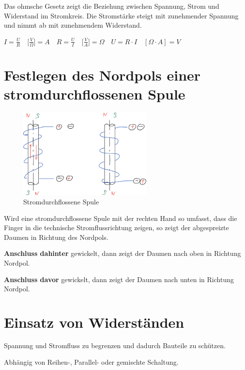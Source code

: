 Das ohmsche Gesetz zeigt die Beziehung zwischen Spannung, Strom und
Widerstand im Stromkreis. Die Stromstärke steigt mit zunehmender
Spannung und nimmt ab mit zunehmendem Widerstand.

$\boxed{I = \frac{U}{R}} \quad \bigl[\frac{V}{\Omega}\bigl] = A \quad  \boxed{R = \frac{U}{I}} \quad \bigl[\frac{V}{A}\bigl] = \Omega \quad  \boxed{U = R \cdot I} \quad [\Omega \cdot A] = V$

\newpage

\section{Festlegen des Nordpols einer stromdurchflossenen
Spule}\label{festlegen-des-nordpols-einer-stromdurchflossenen-spule}

\begin{figure}[!ht]%
\centering
\includegraphics[width=0.6\textwidth]{images/Skizze/03_StromdurchflosseneSpule_Skizze.pdf}
\caption{Stromdurchflossene Spule}
\end{figure}

Wird eine stromdurchflossene Spule mit der rechten Hand so umfasst, dass
die Finger in die technische Stromflussrichtung zeigen, so zeigt der
abgespreizte Daumen in Richtung des Nordpols.

\textbf{Anschluss dahinter} gewickelt, dann zeigt der Daumen nach oben
in Richtung Nordpol.

\textbf{Anschluss davor} gewickelt, dann zeigt der Daumen nach unten in
Richtung Nordpol.

\section{Einsatz von Widerständen}\label{einsatz-von-widerstaenden}

Spannung und Stromfluss zu begrenzen und dadurch Bauteile zu schützen.

Abhängig von Reihen-, Parallel- oder gemischte Schaltung.


